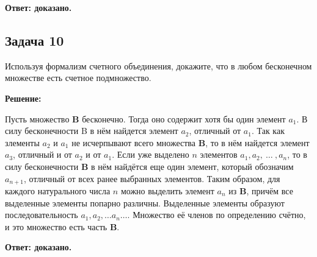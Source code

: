 \documentclass[a4paper,14pt]{article} %
\begin{document}
\begin{flushright}
\begin{large}
\textbf {Ответ: доказано.}
\end{large}
\end{flushright}

\begin{center}
\subsection{Задача 10}
\end{center}

Используя формализм счетного объединения, докажите, что в любом бесконечном множестве есть счетное подмножество.

\begin{center}
\bfseries
{\Large Решение: }
\end{center}


Пусть множество {\bf B} бесконечно. Тогда оно содержит хотя бы один элемент $a_{1}$. В силу бесконечности B в нём найдется элемент $a_{2}$, отличный от $a_{1}$. Так как злементы $a_{2}$ и $a_{1}$ не исчерпывают всего множества {\bf B}, то в нём найдется элемент $a_{3}$, отличный и от $a_{2}$ и от $a_{1}$. Если уже выделено $n$ элементов $a_{1}, a_{2},\ \dots\ , a_{n}$, то в силу бесконечности {\bf B} в нём найдётся еще один элемент, который обозначим $a_{n+1}$, отличный от всех ранее выбранных элементов. Таким образом, для каждого натурального числа $n$ можно выделить элемент $a_{n}$ из {\bf B}, причём все выделенные элементы попарно различны. Выделенные элементы образуют последовательность $ a_{1}, a_{2},\dots a_{n} \dots $. Множество её членов по определению счётно, и это множество есть часть {\bf B}.




\begin{flushright}
\begin{large}
\textbf {Ответ: доказано.}
\end{large}
\end{flushright}
\end{document}
